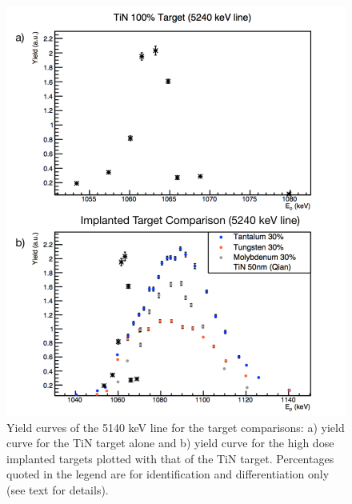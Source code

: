 \begin{figure}
\includegraphics[width=\linewidth]{figures/tinImpCompare.png}
\caption{Yield curves of the 5140 keV line for the target comparisons: a) yield curve for the TiN target alone and b) yield curve for the high dose implanted targets plotted with that of the TiN target. Percentages quoted in the legend are for identification and differentiation only (see text for details).}
\label{fig: yieldComparison}
\end{figure}


